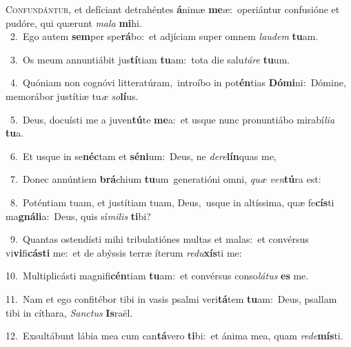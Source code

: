 \lettrine{\initial\textcolor{\initialcolor}{C}}{onfundántur,} et defíciant detrahéntes \textbf{á}\-nimæ \textbf{me}\-æ:~\star operiántur confusióne et pudóre, qui quærunt \textit{ma}\-\textit{la} \textbf{mi}\-hi.\\
{\numbfont\textcolor{\numbcolor}{~2.}}~Ego autem \textbf{sem}\-per spe\-\textbf{rá}\-bo:~\star et adjíciam super omnem \textit{lau}\-\textit{dem} \textbf{tu}\-am.\par
{\numbfont\textcolor{\numbcolor}{~3.}}~Os meum annuntiábit jus\-\textbf{tí}\-tiam \textbf{tu}\-am:~\star tota die salu\-\textit{tá}\-\textit{re} \textbf{tu}\-um.\par
{\numbfont\textcolor{\numbcolor}{~4.}}~Quóniam non cognóvi litteratúram,~\dagger introíbo in pot\-\textbf{én}\-tias \textbf{Dó}\-\textbf{mi}ni:~\star Dómine, memorábor justítiæ tu\textit{æ} \textit{so}\-\textbf{lí}us.\par
{\numbfont\textcolor{\numbcolor}{~5.}}~Deus, docuísti me a juven\-\textbf{tú}\-te \textbf{me}\-a:~\star et usque nunc pronuntiábo mirabí\-\textit{li}\-\textit{a} \textbf{tu}\-a.\par
{\numbfont\textcolor{\numbcolor}{~6.}}~Et usque in se\-\textbf{néc}\-tam et \textbf{sé}\-\textbf{ni}um:~\star Deus, ne \textit{de}\-\textit{re}\textbf{lín}quas me,\par
{\numbfont\textcolor{\numbcolor}{~7.}}~Donec annúntiem \textbf{brá}\-chium \textbf{tu}\-um~\star generatióni omni, \textit{quæ} \textit{ven}\-\textbf{tú}ra est:\par
{\numbfont\textcolor{\numbcolor}{~8.}}~Poténtiam tuam, et justítiam tuam, Deus,~\dagger usque in altíssima, quæ fe\-\textbf{cís}\-ti ma\-\textbf{gná}\-\textbf{li}a:~\star Deus, quis sí\-\textit{mi}\-\textit{lis} \textbf{ti}\-bi?\par
{\numbfont\textcolor{\numbcolor}{~9.}}~Quantas ostendísti mihi tribulatiónes multas et malas:~\dagger et convérsus vi\-\textbf{vi}\-fi\-\textbf{cás}\-\textbf{ti} me:~\star et de abýssis terræ íterum \textit{re}\-\textit{du}\textbf{xís}ti me:\par
{\numbfont\textcolor{\numbcolor}{10.}}~Multiplicásti magnifi\-\textbf{cén}\-tiam \textbf{tu}\-am:~\star et convérsus conso\-\textit{lá}\-\textit{tus} \textbf{es} me.\par
{\numbfont\textcolor{\numbcolor}{11.}}~Nam et ego confitébor tibi in vasis psalmi veri\-\textbf{tá}\-tem \textbf{tu}\-am:~\star Deus, psallam tibi in cíthara, \textit{Sanc}\-\textit{tus} \textbf{Is}\-raël.\par
{\numbfont\textcolor{\numbcolor}{12.}}~Exsultábunt lábia mea cum can\-\textbf{tá}\-vero \textbf{ti}\-bi:~\star et ánima mea, quam \textit{red}\-\textit{e}\textbf{mís}ti.\par
